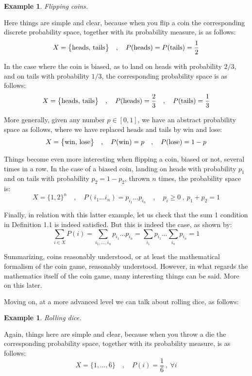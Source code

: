\documentclass[12pt]{amsbook}
\newtheorem{example}[theorem]{Example}
\begin{document}
\begin{example}
Flipping coins.
\end{example}

Here things are simple and clear, because when you flip a coin the corresponding discrete probability space, together with its probability measure, is as follows:
$$X=\big\{{\rm heads},\,{\rm tails}\big\}\quad,\quad P({\rm heads})=P({\rm tails})=\frac{1}{2}$$

In the case where the coin is biased, as to land on heads with probability $2/3$, and on tails with probability $1/3$, the corresponding probability space is as follows:
$$X=\big\{{\rm heads},\,{\rm tails}\big\}\quad,\quad P({\rm heads})=\frac{2}{3}\quad,\quad P({\rm tails})=\frac{1}{3}$$

More generally, given any number $p\in[0,1]$, we have an abstract probability space as follows, where we have replaced heads and tails by win and lose:
$$X=\big\{{\rm win},\,{\rm lose}\big\}\quad,\quad P({\rm win})=p\quad,\quad P({\rm lose})=1-p$$

Things become even more interesting when flipping a coin, biased or not, several times in a row. In the case of a biased coin, landing on heads with probability $p_1$ and on tails with probability $p_2=1-p_2$, thrown $n$ times, the probability space is:
$$X=\big\{1,2\}^n\quad,\quad P(i_1\ldots i_n)=p_{i_1}\ldots p_{i_n}\quad,\quad p_i\geq0\ ,\ p_1+p_2=1$$

Finally, in relation with this latter example, let us check that the sum 1 condition in Definition 1.1 is indeed satisfied. But this is indeed the case, as shown by:
$$\sum_{i\in X}P(i)
=\sum_{i_1,\ldots,i_n}p_{i_1}\ldots p_{i_n}
=\sum_{i_1}p_{i_1}\ldots\sum_{i_n}p_{i_n}
=1$$

Summarizing, coins reasonably understood, or at least the mathematical formalism of the coin game, reasonably understood. However, in what regards the mathematics itself of the coin game, many interesting things can be said. More on this later.

\bigskip

Moving on, at a more advanced level we can talk about rolling dice, as follows:

\begin{example}
Rolling dice.
\end{example}

Again, things here are simple and clear, because when you throw a die the corresponding probability space, together with its probability measure, is as follows:
$$X=\big\{1,\ldots,6\big\}\quad,\quad P(i)=\frac{1}{6}\ ,\ \forall i$$
\end{document}

